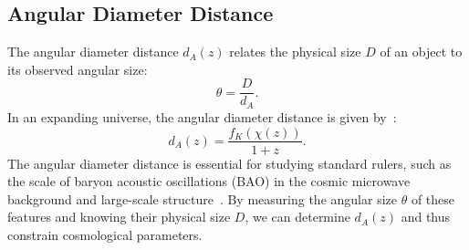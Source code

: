 \subsection{Angular Diameter Distance}
The angular diameter distance \( d_A(z) \) relates the physical size \( D \) of an object to its observed angular size:
\begin{equation}
    \theta = \frac{D}{d_A}.
    \label{eq:angular_diameter}
\end{equation}
In an expanding universe, the angular diameter distance is given by~\citep{1999astro.ph..5116H}:
\begin{equation}
    d_A(z) = \frac{f_K(\chi(z))}{1 + z}.
    \label{eq:angular_diameter_distance}
\end{equation}
The angular diameter distance is essential for studying standard rulers, such as the scale of baryon acoustic oscillations (BAO) in the cosmic microwave background and large-scale structure~\citep{2005ApJ...633..560E}. By measuring the angular size \( \theta \) of these features and knowing their physical size \( D \), we can determine \( d_A(z) \) and thus constrain cosmological parameters.